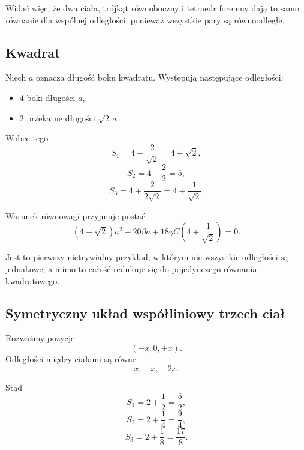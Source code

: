 \documentclass[11pt,a4paper]{article}
\theoremstyle{plain}
\theoremstyle{remark}
\begin{document}
Widać więc, że dwa ciała, trójkąt równoboczny i tetraedr foremny dają to samo równanie dla wspólnej odległości, ponieważ wszystkie pary są równoodległe.

\subsection{Kwadrat}

Niech $a$ oznacza długość boku kwadratu. Występują następujące odległości:
\begin{itemize}
    \item $4$ boki długości $a$,
    \item $2$ przekątne długości $\sqrt{2}\,a$.
\end{itemize}

Wobec tego
\begin{equation}
S_1 = 4 + \frac{2}{\sqrt{2}} = 4 + \sqrt{2},
\end{equation}
\begin{equation}
S_2 = 4 + \frac{2}{2} = 5,
\end{equation}
\begin{equation}
S_3 = 4 + \frac{2}{2\sqrt{2}} = 4 + \frac{1}{\sqrt{2}}.
\end{equation}

Warunek równowagi przyjmuje postać
\begin{equation}
\boxed{(4+\sqrt{2})a^2 - 20\beta a + 18\gamma C\left(4+\frac{1}{\sqrt{2}}\right)=0.}
\end{equation}

Jest to pierwszy nietrywialny przykład, w którym nie wszystkie odległości są jednakowe, a mimo to całość redukuje się do pojedynczego równania kwadratowego.

\subsection{Symetryczny układ współliniowy trzech ciał}

Rozważmy pozycje
\begin{equation}
(-x,0,+x).
\end{equation}
Odległości między ciałami są równe
\begin{equation}
x,\quad x,\quad 2x.
\end{equation}

Stąd
\begin{equation}
S_1 = 2 + \frac{1}{2} = \frac{5}{2},
\end{equation}
\begin{equation}
S_2 = 2 + \frac{1}{4} = \frac{9}{4},
\end{equation}
\begin{equation}
S_3 = 2 + \frac{1}{8} = \frac{17}{8}.
\end{equation}
\end{document}
